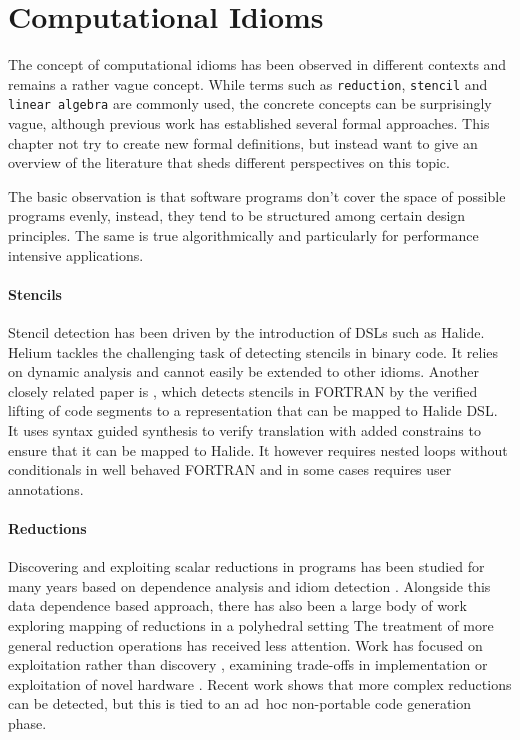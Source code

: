 \section{Computational Idioms}

    The concept of computational idioms has been observed in different contexts
    and remains a rather vague concept.
    While terms such as \texttt{reduction}, \texttt{stencil} and
    \texttt{linear algebra} are commonly used, the concrete concepts can be
    surprisingly vague, although previous work has established several formal
    approaches.
    This chapter not try to create new formal definitions, but instead want to
    give an overview of the literature that sheds different perspectives on this
    topic.

    The basic observation is that software programs don't cover the space of
    possible programs evenly, instead, they tend to be structured among certain
    design principles.
    The same is true algorithmically and particularly for performance intensive
    applications.

\paragraph*{Stencils}
    Stencil detection has been driven by the introduction of DSLs such as
    Halide.  Helium \cite{Mendis2015Helium} tackles the challenging task
    of detecting stencils in binary code. It relies
    on dynamic analysis and cannot easily be extended to
    other idioms.
    Another closely related paper is \cite{Kamil2016Verified}, which detects stencils in FORTRAN by the
    verified lifting of code segments to a representation that can be
    mapped to Halide DSL.  It uses syntax guided synthesis to verify
    translation with added constrains to ensure that it can be mapped to
    Halide.
    It however requires nested loops  without conditionals in well behaved FORTRAN
    and in some cases requires user annotations.

\paragraph*{Reductions}
    Discovering and exploiting scalar reductions in programs has been
    studied for many years based on dependence analysis and idiom detection
     \cite{fisher1994parallelizing,pottenger1995idiom,suganuma1996detection}.
    Alongside this data dependence based approach, there has also been a
     large body of work exploring mapping of reductions in a
     polyhedral setting \cite{jouvelot1989unified,redon1994scheduling}
     The treatment of
    more general reduction operations has received  less attention.
    Work has focused on exploitation rather than discovery
    \cite{Gutierrez:2000,gutierrez2003optimization,gutierrez2008analytical}, examining trade-offs in implementation \cite{yu2006adaptive}
     or exploitation of novel hardware \cite{ravi2010compiler,Huo2011HiPC}.
    Recent work \cite{ginsbach2017discovery} shows that more complex reductions can be 
    detected, but this is tied to  an  ad~hoc non-portable code generation phase. 


